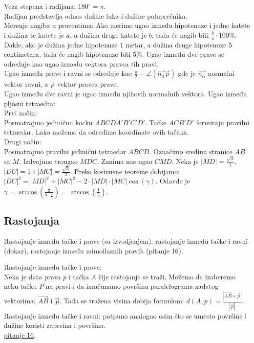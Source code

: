 \documentclass[12pt]{article}
\newcommand{\vek}[1]{\overrightarrow{#1}}
\begin{document}
\vspace*{1cm}

Veza stepena i radijana: $180^\circ=\pi$.\\
Radijan predstavlja odnos dužine luka i dužine poluprečnika.\\
Merenje nagiba u procentima: Ako merimo ugao između hipotenuze
i jedne katete i dužina te katete je $a$, a dužina druge
katete je $b$, tada će nagib biti $\frac{b}{a}\cdot 100\%$. Dakle,
ako je dužina jedne hipotenuze $1$ metar, a dužina druge
hipotenuze $5$ centimetara, tada će nagib hipotenuze biti $5\%$.
Ugao između dve prave se određuje kao ugao između vektora pravca
tih pravi.\\
Ugao između prave i ravni se određuje kao $\frac{\pi}{2}-\angle(\vek{n_\alpha}\vek{p})$
gde je $\vek{n_\alpha}$ normalni vektor ravni, a $\vek{p}$ vektor pravca prave.\\
Ugao između dve ravni je ugao između njihovih normalnih vektora.
Ugao između pljosni tetraedra:\\
Prvi način:\\
Posmatrajmo jediničnu kocku $ABCDA'B'C'D'$.
Tačke $ACB'D'$ formiraju pravilni tetraedar. Lako možemo
da odredimo koordinate ovih tačaka.\\
Drugi način:\\
Posmatrajmo pravilni jedinični tetraedar $ABCD$. Označimo sredinu
stranice $AB$ sa $M$. Izdvojimo trougao $MDC$. Zanima nas
ugao $CMD$. Neka je $|MD|=\frac{\sqrt{3}}{2}$, $|DC|=1$ i $|MC|=\frac{\sqrt{3}}{2}$.
Preko kosinusne teoreme dobijamo:\\
$|DC|^2=|MD|^2+|MC|^2-2\cdot|MD|\cdot|MC|\cos(\gamma)$.
Odavde je $\gamma=\arccos(\frac{\frac{1}{2}}{2\cdot\frac{3}{4}})=\arccos(\frac{1}{3})$.
\subsection{Rastojanja}
Rastojanje između tačke i prave (sa izvodjenjem),
rastojanje između tačke i ravni (dokaz), rastojanje između
mimoilaznih pravih (pitanje 16).\par

\vspace*{1cm}

Rastojanje između tačke i prave:\\
Neka je data prava $p$ i tačka $A$ čije rastojanje se traži.
Možemo da izaberemo neku tačku $P$ na pravi i da izračunamo
površinu paralelograma zadatog vektorima: $\vek{AB}$ i $\vek{p}$.
Tada se tražena visina dobija formulom: $d(A,p)=\frac{|\vek{AB}\times\vek{p}|}{|\vek{p}|}$.\\
Rastojanje između tačke i ravni: potpuno analogno osim što
se umesto površine i dužine koristi zapreina i površina.\\
\hyperlink{subsec:pitanje_16}{pitanje 16}.
\end{document}
